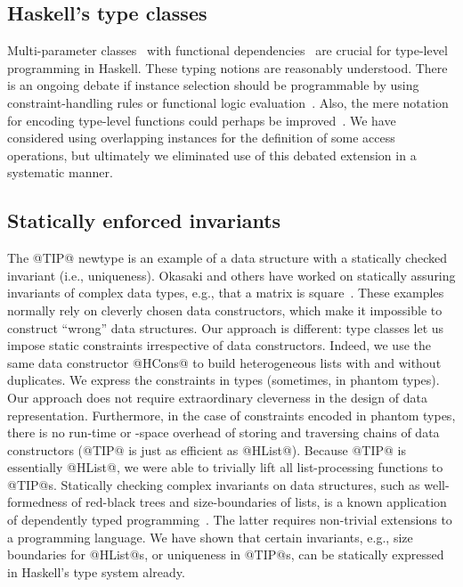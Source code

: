 \documentclass[nocopyrightspace,preprint]{sigplan-proc}
\begin{document}



\medskip

\subsection*{Haskell's type classes}

Multi-parameter classes~\cite{CHO92,MPJ92,MPJ95,PJJM97} with
functional dependencies~\cite{MPJ00,DPJSS04} are crucial for
type-level programming in Haskell. These typing notions are reasonably
understood. There is an ongoing debate if instance selection should be
programmable by using constraint-handling rules or functional logic
evaluation~\cite{SS02,NTGS02}. Also, the mere notation for encoding
type-level functions could perhaps be improved~\cite{NTGS01}. We have
considered using overlapping instances for the definition of some
access operations, but ultimately we eliminated use of this debated
extension in a systematic manner.






\medskip

\subsection*{Statically enforced invariants}

The @TIP@ newtype is an example of a data structure with a statically
checked invariant (i.e., uniqueness). Okasaki and others have worked
on statically assuring invariants of complex data types, e.g., that a
matrix is square~\cite{Okasaki99}. These examples normally rely on
cleverly chosen data constructors, which make it impossible to
construct ``wrong'' data structures. Our approach is different: type
classes let us impose static constraints irrespective of data
constructors. Indeed, we use the same data constructor @HCons@ to
build heterogeneous lists with and without duplicates. We express the
constraints in types (sometimes, in phantom types). Our approach does
not require extraordinary cleverness in the design of data
representation. Furthermore, in the case of constraints encoded in
phantom types, there is no run-time or -space overhead of storing and
traversing chains of data constructors (@TIP@ is just as efficient as
@HList@). Because @TIP@ is essentially @HList@, we were able to
trivially lift all list-processing functions to @TIP@s. Statically
checking complex invariants on data structures, such as
well-formedness of red-black trees and size-boundaries of lists, is a
known application of dependently typed programming~\cite{XP99}. The
latter requires non-trivial extensions to a programming language. We
have shown that certain invariants, e.g., size boundaries for
@HList@s, or uniqueness in @TIP@s, can be statically expressed in
Haskell's type system already.
\end{document}
